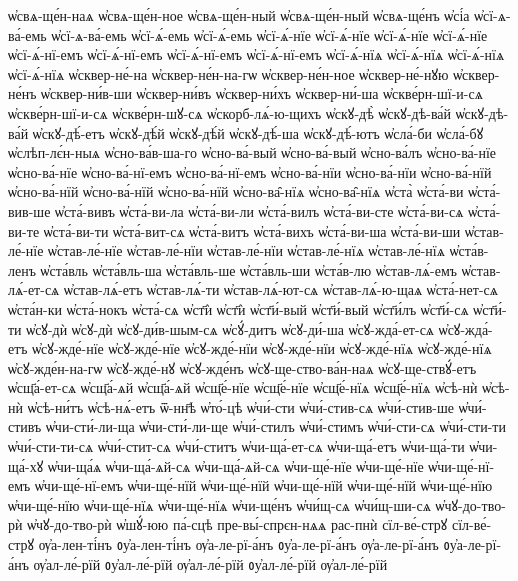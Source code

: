 {ѡ҆свѧ-ще́н-наѧ
ѡ҆свѧ-ще́н-ное
ѡ҆свѧ-ще́н-ный
ѡ҆свѧ-ще́н-ный
ѡ҆свѧ-ще́нъ
ѡ҆сі́а
ѡ҆сї-ѧ-ва́-емь
ѡ҆сї-ѧ-ва́-емь
ѡ҆сї-ѧ́-емь
ѡ҆сї-ѧ́-емь
ѡ҆сї-ѧ́-нїе
ѡ҆сї-ѧ́-нїе
ѡ҆сї-ѧ́-нїе
ѡ҆сї-ѧ́-нїе
ѡ҆сї-ѧ́-нї-емъ
ѡ҆сї-ѧ́-нї-емъ
ѡ҆сї-ѧ́-нї-емъ
ѡ҆сї-ѧ́-нї-емъ
ѡ҆сї-ѧ́-нїѧ
ѡ҆сї-ѧ́-нїѧ
ѡ҆сї-ѧ́-нїѧ
ѡ҆сї-ѧ́-нїѧ
ѡ҆сквер-не́-на
ѡ҆сквер-не́н-на-гѡ
ѡ҆сквер-не́н-ное
ѡ҆сквер-не́-нꙋю
ѡ҆сквер-не́нъ
ѡ҆сквер-ни́в-ши
ѡ҆сквер-ни́въ
ѡ҆сквер-ни́хъ
ѡ҆сквер-ни́-ша
ѡ҆скве́рн-шї-и-сѧ
ѡ҆скве́рн-шї-и-сѧ
ѡ҆скве́рн-шꙋ-сѧ
ѡ҆скорб-лѧ́-ю-щихъ
ѡ҆скꙋ-дѣ̀
ѡ҆скꙋ-дѣ-ва́й
ѡ҆скꙋ-дѣ-ва́й
ѡ҆скꙋ-дѣ́-етъ
ѡ҆скꙋ-дѣ́й
ѡ҆скꙋ-дѣ́й
ѡ҆скꙋ-дѣ́-ша
ѡ҆скꙋ-дѣ́-ютъ
ѡ҆сла́-би
ѡ҆сла́-бꙋ
ѡ҆слѣп-лє́н-ныѧ
ѡ҆сно-ва́в-ша-го
ѡ҆сно-ва́-вый
ѡ҆сно-ва́-вый
ѡ҆сно-ва́лъ
ѡ҆сно-ва́-нїе
ѡ҆сно-ва́-нїе
ѡ҆сно-ва́-нї-емъ
ѡ҆сно-ва́-нї-емъ
ѡ҆сно-ва́-нїи
ѡ҆сно-ва́-нїи
ѡ҆сно-ва́-нїй
ѡ҆сно-ва́-нїй
ѡ҆сно-ва́-нїй
ѡ҆сно-ва́-нїй
ѡ҆сно-ва̑-нїѧ
ѡ҆сно-ва̑-нїѧ
ѡ҆ста̀
ѡ҆ста́-ви
ѡ҆ста́-вив-ше
ѡ҆ста́-вивъ
ѡ҆ста́-ви-ла
ѡ҆ста́-ви-ли
ѡ҆ста́-вилъ
ѡ҆ста́-ви-сте
ѡ҆ста́-ви-сѧ
ѡ҆ста́-ви-те
ѡ҆ста́-ви-ти
ѡ҆ста́-вит-сѧ
ѡ҆ста́-витъ
ѡ҆ста́-вихъ
ѡ҆ста́-ви-ша
ѡ҆ста́-ви-ши
ѡ҆став-ле́-нїе
ѡ҆став-ле́-нїе
ѡ҆став-ле́-нїи
ѡ҆став-ле́-нїи
ѡ҆став-ле́-нїѧ
ѡ҆став-ле́-нїѧ
ѡ҆ста́в-ленъ
ѡ҆ста́вль
ѡ҆ста́вль-ша
ѡ҆ста́вль-ше
ѡ҆ста́вль-ши
ѡ҆ста́в-лю
ѡ҆став-лѧ́-емъ
ѡ҆став-лѧ́-ет-сѧ
ѡ҆став-лѧ́-етъ
ѡ҆став-лѧ́-ти
ѡ҆став-лѧ́-ют-сѧ
ѡ҆став-лѧ́-ю-щаѧ
ѡ҆ста́-нет-сѧ
ѡ҆ста́н-ки
ѡ҆ста́-нокъ
ѡ҆ста́-сѧ
ѡ҆ст҃ѝ
ѡ҆ст҃ѝ
ѡ҆ст҃и́-вый
ѡ҆ст҃и́-вый
ѡ҆ст҃и́лъ
ѡ҆ст҃и́-сѧ
ѡ҆ст҃и́-ти
ѡ҆сꙋ-дѝ
ѡ҆сꙋ-дѝ
ѡ҆сꙋ-ди́в-шым-сѧ
ѡ҆сꙋ́-дитъ
ѡ҆сꙋ-ди́-ша
ѡ҆сꙋ-жда́-ет-сѧ
ѡ҆сꙋ-жда́-етъ
ѡ҆сꙋ-жде́-нїе
ѡ҆сꙋ-жде́-нїе
ѡ҆сꙋ-жде́-нїи
ѡ҆сꙋ-жде́-нїи
ѡ҆сꙋ-жде́-нїѧ
ѡ҆сꙋ-жде́-нїѧ
ѡ҆сꙋ-жде́н-на-гѡ
ѡ҆сꙋ-жде́-нꙋ
ѡ҆сꙋ-жде́нъ
ѡ҆сꙋ-ще-ство-ва́н-наѧ
ѡ҆сꙋ-ще-ствꙋ́-етъ
ѡ҆сщ҃а́-ет-сѧ
ѡ҆сщ҃а́-ѧй
ѡ҆сщ҃а́-ѧй
ѡ҆сщ҃е́-нїе
ѡ҆сщ҃е́-нїе
ѡ҆сщ҃е́-нїѧ
ѡ҆сщ҃е́-нїѧ
ѡ҆сѣ-нѝ
ѡ҆сѣ-нѝ
ѡ҆сѣ-ни́тъ
ѡ҆сѣ-нѧ́-етъ
ѿ-нн҃ѣ
ѡ҆то́-цѣ
ѡ҆чи́-сти
ѡ҆чи́-стив-сѧ
ѡ҆чи́-стив-ше
ѡ҆чи́-стивъ
ѡ҆чи-сти́-ли-ща
ѡ҆чи-сти́-ли-ще
ѡ҆чи́-стилъ
ѡ҆чи́-стимъ
ѡ҆чи́-сти-сѧ
ѡ҆чи́-сти-ти
ѡ҆чи́-сти-ти-сѧ
ѡ҆чи́-стит-сѧ
ѡ҆чи́-ститъ
ѡ҆чи-ща́-ет-сѧ
ѡ҆чи-ща́-етъ
ѡ҆чи-ща́-ти
ѡ҆чи-ща́-хꙋ
ѡ҆чи-ща́ѧ
ѡ҆чи-ща́-ѧй-сѧ
ѡ҆чи-ща́-ѧй-сѧ
ѡ҆чи-ще́-нїе
ѡ҆чи-ще́-нїе
ѡ҆чи-ще́-нї-емъ
ѡ҆чи-ще́-нї-емъ
ѡ҆чи-ще́-нїй
ѡ҆чи-ще́-нїй
ѡ҆чи-ще́-нїй
ѡ҆чи-ще́-нїй
ѡ҆чи-ще́-нїю
ѡ҆чи-ще́-нїю
ѡ҆чи-ще́-нїѧ
ѡ҆чи-ще́-нїѧ
ѡ҆чи-ще́нъ
ѡ҆чи́щ-сѧ
ѡ҆чи́щ-ши-сѧ
ѡ҆чꙋ-до-тво-рѝ
ѡ҆чꙋ-до-тво-рѝ
ѡ҆шꙋ́-юю
па́-сцѣ
пре-вы́-спрєн-нѧѧ
рас-пнѝ
сїл-ве́-стрꙋ
сїл-ве́-стрꙋ
ѹ҆а-лен-ті́нъ
ᲂу҆а-лен-ті́нъ
ѹ҆а-ле-рї-а́нъ
ᲂу҆а-ле-рї-а́нъ
ѹ҆а-ле-рї-а́нъ
ᲂу҆а-ле-рї-а́нъ
ѹ҆ал-ле́-рїй
ᲂу҆ал-ле́-рїй
ѹ҆ал-ле́-рїй
ᲂу҆ал-ле́-рїй
ѹ҆ал-ле́-рїй
}
